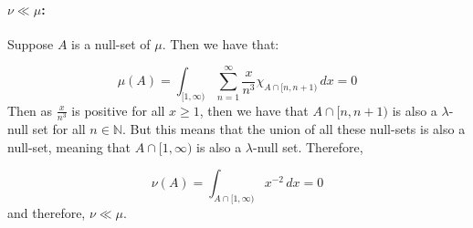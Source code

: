 \documentclass{article}
\theoremstyle{definition}
\numberwithin{theorem}{section}
\numberwithin{equation}{section}
\begin{document}
\paragraph{$\nu \ll \mu$:}

Suppose $A$ is a null-set of $\mu$. Then we have that:

\begin{equation}
	\mu(A) = \int_{[1, \infty)}\sum_{n = 1}^{\infty} \frac{x}{n^3} \chi_{A\cap [n, n + 1)} \, dx  = 0
\end{equation}
Then as $\frac{x}{n^3}$ is positive for all $x \geq 1$, then we have that $A \cap [n, n + 1)$ is also a $\lambda$-null set for all $n \in \mathbb{N}$. But this means that the union of all these null-sets is also a null-set, meaning that $A \cap [1, \infty)$ is also a $\lambda$-null set. Therefore, 

\begin{equation}
	\nu(A) = \int_{A \cap [1, \infty)} x^{-2} \, dx = 0
\end{equation}
and therefore, $\nu \ll \mu$.
\end{document}
